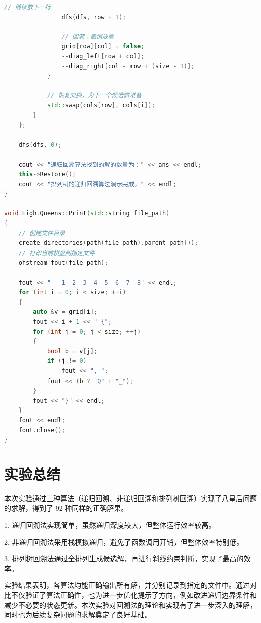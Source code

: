 \documentclass[12pt, a4paper, oneside]{ctexart}
\begin{document}
\begin{lstlisting}[language=C++, breaklines=true]
				// 继续放下一行
				dfs(dfs, row + 1);

				// 回溯：撤销放置
				grid[row][col] = false;
				--diag_left[row + col];
				--diag_right[col - row + (size - 1)];
			}

			// 恢复交换，为下一个候选做准备
			std::swap(cols[row], cols[i]);
		}
	};

    dfs(dfs, 0);

    cout << "递归回溯算法找到的解的数量为：" << ans << endl;
    this->Restore();
    cout << "排列树的递归回溯算法演示完成。" << endl;
}

void EightQueens::Print(std::string file_path)
{
	// 创建文件目录
	create_directories(path(file_path).parent_path());
	// 打印当前棋盘到指定文件
	ofstream fout(file_path);
	
	fout << "   1  2  3  4  5  6  7  8" << endl;
	for (int i = 0; i < size; ++i)
	{
		auto &v = grid[i];
		fout << i + 1 << " {";
		for (int j = 0; j < size; ++j)
		{
			bool b = v[j];
			if (j != 0)
				fout << ", ";
			fout << (b ? "Q" : "_");
		}
		fout << "}" << endl;
	}
	fout << endl;
	fout.close();
}
\end{lstlisting}

\section{实验总结}
\begin{flushleft}
\songti\fontsize{16pt}{16pt}\selectfont
本次实验通过三种算法（递归回溯、非递归回溯和排列树回溯）实现了八皇后问题的求解，得到了 92 种同样的正确解果。

1. 递归回溯法实现简单，虽然递归深度较大，但整体运行效率较高。  

2. 非递归回溯法采用栈模拟递归，避免了函数调用开销，但整体效率特别低。 

3. 排列树回溯法通过全排列生成候选解，再进行斜线约束判断，实现了最高的效率。

实验结果表明，各算法均能正确输出所有解，并分别记录到指定的文件中。通过对比不仅验证了算法正确性，也为进一步优化提示了方向，例如改进递归边界条件和减少不必要的状态更新。本次实验对回溯法的理论和实现有了进一步深入的理解，同时也为后续复杂问题的求解奠定了良好基础。
\end{flushleft}
\end{document}
